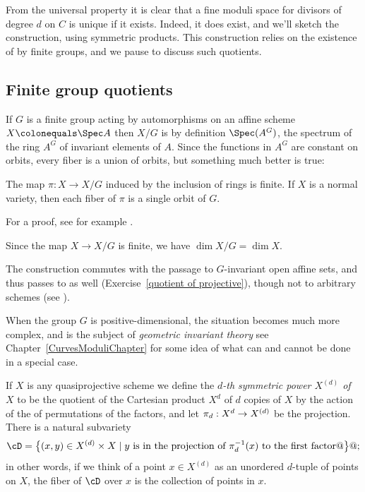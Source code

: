 From the universal property it is clear that a fine moduli space for
divisors of degree $d$ on $C$ is unique if it exists. Indeed, it does
exist, and we'll sketch the construction, using symmetric products.
This construction relies on the existence of 
%
by
finite groups, and we pause to discuss such quotients.

\subsection*{Finite group quotients}

If $G$ is a finite group acting by automorphisms on an affine scheme
%
%
%
%
%
%
$X\colonequals\Spec A$ then $X/G$ is by definition $\Spec(A^G)$, the spectrum of
the ring $A^G$ of invariant elements of $A$. Since the functions in $A^{G}$ 
are constant on orbits, every fiber is a union of orbits, but something much better is true:

\begin{theorem}\label{finite invariant theory}
The map $\pi: X\to X/G$ induced by the inclusion of rings is finite. 
%
If $X$ is a normal variety, then each fiber of $\pi$  is a single orbit of $G$.
\end{theorem}

For a proof, see for example \cite[Proposition 13.10]{Eisenbud1995}.  


Since the map $X\to X/G$ is finite, we have $\dim X/G = \dim X$. 

The construction commutes with the passage to $G$-invariant open
%
affine sets, and thus passes to 
%
as well
(Exercise~\ref{quotient of projective}), though not to arbitrary
schemes (see \cite[Example 5.3.2]{Olsson}). 

When the group $G$ is positive-dimensional, the situation becomes much more complex, and is the subject
%
of 
\emph{geometric invariant theory}
\emdash see Chapter~\ref{CurvesModuliChapter} 
for some  idea of what can and cannot be done
in a special case.

If $X$ is any  quasiprojective scheme we define the 
\emph{$d$-th symmetric power $X^{(d)}$ of\, $X$} 
%
to be the quotient of the Cartesian product $X^d$ of $d$ copies of $X$
by the action of the 
%
 of 
permutations of the factors, and let $\pi_d: X^d\to\nobreak X^{(d)}$ be
the projection. There is a natural
subvariety 
$$
\cD = \bigl\{(x,y) \in X^{(d)} \times X\mid \hbox{$y$ is in the projection of $\pi_d^{-1}(x)$ to the first factor}@\bigr\}@;
$$
in other words, if we think of a point $x \in X^{(d)}$ as an unordered $d$-tuple of points on $X$, the fiber of $\cD$ over $x$ is the collection of points in $x$.

